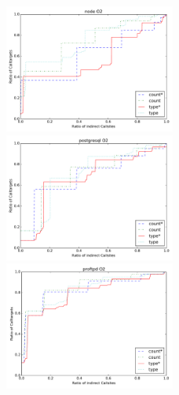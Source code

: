 \begin{figure}
\includegraphics[width=0.5\textwidth]{../MA_Pictures/node.pdf}\\
\includegraphics[width=0.5\textwidth]{../MA_Pictures/postgresql.pdf}
\includegraphics[width=0.5\textwidth]{../MA_Pictures/proftpd.pdf}
\end{figure}



%
%
%
%

